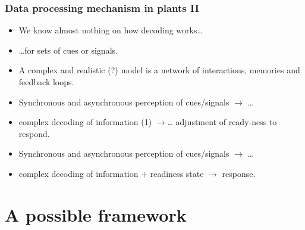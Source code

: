 \documentclass[11pt]{beamer}\usepackage[]{graphicx}\usepackage[]{xcolor}
\begin{document}
\begin{frame}
\frametitle{Data processing mechanism in plants II}
\begin{itemize}
  \item We know almost nothing on how decoding works\ldots
  \item[] \ldots for sets of cues or signals.
  \item A complex and realistic (?) model is a network of interactions, memories and feedback loops.
  \item Synchronous and asynchronous perception of cues/signals $\rightarrow$ \ldots
  \item[] complex decoding of information (1) $\rightarrow$\ldots
    adjustment of ready-ness to respond.
  \item Synchronous and asynchronous perception of cues/signals $\rightarrow$ \ldots
  \item[] complex decoding of information + readiness state $\rightarrow$ response.
\end{itemize}
\end{frame}

\section{A possible framework}
\end{document}
